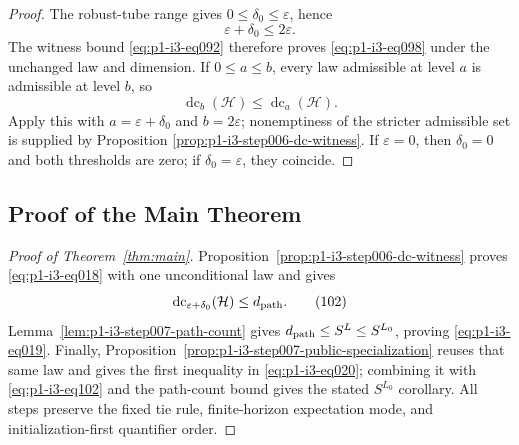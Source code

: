 \begin{proof}
The robust-tube range gives $0\leq\delta_0\leq\varepsilon$, hence
\[
\varepsilon+\delta_0\leq2\varepsilon.
\tag{100}\label{eq:p1-i3-eq100}
\]
The witness bound \eqref{eq:p1-i3-eq092} therefore proves \eqref{eq:p1-i3-eq098} under the unchanged law and
dimension.  If $0\leq a\leq b$, every law admissible at level $a$ is
admissible at level $b$, so
\[
\operatorname{dc}_b(\mathcal H)\leq\operatorname{dc}_a(\mathcal H).
\tag{101}\label{eq:p1-i3-eq101}
\]
Apply this with $a=\varepsilon+\delta_0$ and $b=2\varepsilon$; nonemptiness
of the stricter admissible set is supplied by Proposition
\ref{prop:p1-i3-step006-dc-witness}.  If $\varepsilon=0$, then $\delta_0=0$
and both thresholds are zero; if $\delta_0=\varepsilon$, they coincide.
\end{proof}

\subsection{Proof of the Main Theorem}
\label{app:main-proof}

\begin{proof}[Proof of Theorem~\ref{thm:main}]
Proposition~\ref{prop:p1-i3-step006-dc-witness} proves \eqref{eq:p1-i3-eq018} with one
unconditional law and gives
\[
\operatorname{dc}_{\varepsilon+\delta_0}(\mathcal H)
\leq d_{\rm path}.
\tag{102}\label{eq:p1-i3-eq102}
\]
Lemma~\ref{lem:p1-i3-step007-path-count} gives
$d_{\rm path}\leq S^L\leq S^{L_0}$, proving \eqref{eq:p1-i3-eq019}.  Finally,
Proposition~\ref{prop:p1-i3-step007-public-specialization} reuses that same
law and gives the first inequality in \eqref{eq:p1-i3-eq020}; combining it with \eqref{eq:p1-i3-eq102} and the
path-count bound gives the stated $S^{L_0}$ corollary.  All steps preserve the
fixed tie rule, finite-horizon expectation mode, and initialization-first
quantifier order.
\end{proof}
